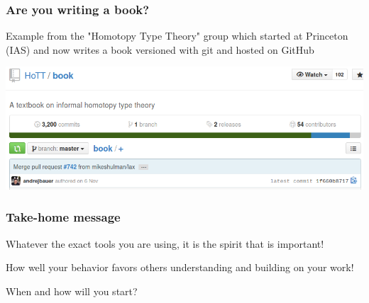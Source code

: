 \documentclass[c]{beamer} %
\begin{document}
\begin{frame}
  \frametitle{Are you writing a book?}
  Example from the "Homotopy Type Theory" group which started at Princeton (IAS) and now writes a book versioned with git and hosted on GitHub
  
  \bigskip
  
  \begin{center}
    \includegraphics[width=\textwidth,height=\textheight,keepaspectratio=true]{HoTT_book}%
  \end{center}
\end{frame}

\begin{frame}
  \frametitle{Take-home message}
  Whatever the exact tools you are using, it is the spirit that is important!
  
  \bigskip
  \pause
  
  How well your behavior favors others understanding and building on your work!
  
  \bigskip
  \pause
  
  When and how will you start?
\end{frame}
\end{document}
